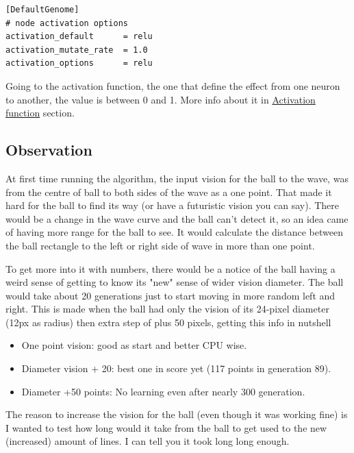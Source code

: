 \begin{listing}[H]
\begin{verbatim}
[DefaultGenome]
# node activation options
activation_default      = relu
activation_mutate_rate  = 1.0
activation_options      = relu
\end{verbatim}
\end{listing}

Going to the activation function, the one that define the effect from one neuron to another, the value is between 0 and 1. More info about it in \hyperref[sec:activation-function]{Activation function} section.  



\subsection{Observation}\label{Observation}
At first time running the algorithm, the input vision for the ball to the wave, was from the centre of ball to both sides of the wave as a one point. That made it hard for the ball to find its way (or have a futuristic vision you can say). There would be a change in the wave curve and the ball can't detect it, so an idea came of having more range for the ball to see. It would calculate the distance between the ball rectangle to the left or right side of wave in more than one point.

To get more into it with numbers, there would be a notice of the ball having a weird sense of getting to know its "new" sense of wider vision diameter. The ball would take about 20 generations just to start moving in more random left and right. This is made when the ball had only the vision of its 24-pixel diameter (12px as radius) then extra step of plus 50 pixels, getting this info in nutshell
\begin{itemize}
\item One point vision: good as start and better CPU wise.
\item Diameter vision + 20: best one in score yet (117 points in generation 89).
\item Diameter +50 points: No learning even after nearly 300 generation.
\end{itemize}

The reason to increase the vision for the ball (even though it was working fine) is I wanted to test how long would it take from the ball to get used to the new (increased) amount of lines. I can tell you it took long long enough.

